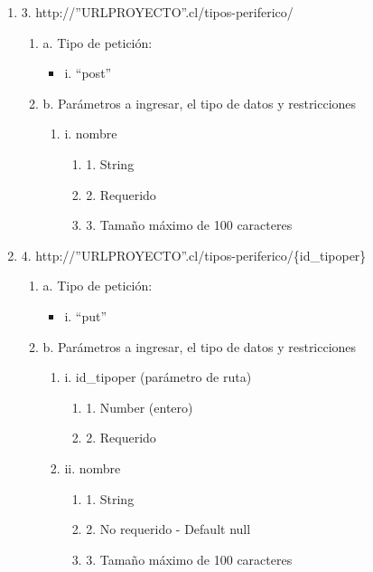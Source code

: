 \begin{enumerate}
    \item 3. http://”URLPROYECTO”.cl/tipos-periferico/
    \begin{enumerate}
        \item a. Tipo de petición:
            \begin{itemize}
               \item i. “post”
            \end{itemize}
        \item b. Parámetros a ingresar, el tipo de datos y restricciones
            \begin{enumerate}
                \item i. nombre
                    \begin{enumerate}
                        \item 1. String
                        \item 2. Requerido
                        \item 3. Tamaño máximo de 100 caracteres
                    \end{enumerate}
            \end{enumerate}
    \end{enumerate}

    \item 4. http://”URLPROYECTO”.cl/tipos-periferico/\{id\_tipoper\}
    \begin{enumerate}
        \item a. Tipo de petición:
            \begin{itemize}
               \item i. “put”
            \end{itemize}
        \item b. Parámetros a ingresar, el tipo de datos y restricciones
            \begin{enumerate}
                \item i. id\_tipoper (parámetro de ruta)
                    \begin{enumerate}
                        \item 1. Number (entero)
                        \item 2. Requerido
                    \end{enumerate}
                \item ii. nombre
                    \begin{enumerate}
                        \item 1. String
                        \item 2. No requerido - Default null
                        \item 3. Tamaño máximo de 100 caracteres
                    \end{enumerate}
            \end{enumerate}
    \end{enumerate}


\end{enumerate}
